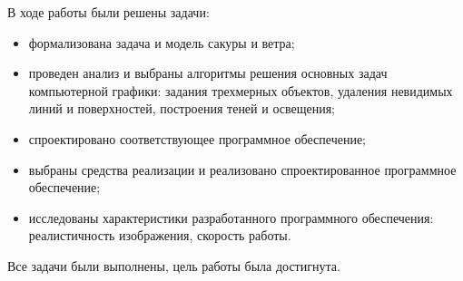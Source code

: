 
В ходе работы были решены задачи:
\begin{itemize}
	\item формализована задача и модель сакуры и ветра;
	\item проведен анализ и выбраны алгоритмы решения основных задач компьютерной графики: задания трехмерных объектов, удаления невидимых линий и поверхностей, построения теней и освещения;
	\item спроектировано соответствующее программное обеспечение;
	\item выбраны средства реализации и реализовано спроектированное программное обеспечение;
	\item исследованы характеристики разработанного программного обеспечения: реалистичность изображения, скорость работы.
\end{itemize}
Все задачи были выполнены, цель работы была достигнута.
